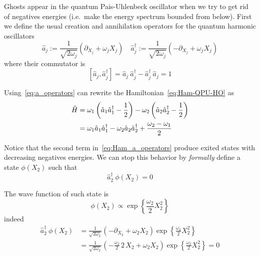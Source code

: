Ghosts appear in the quantum Pais-Uhlenbeck oscillator when we try to get rid
of negatives energies (i.e.\ make the energy spectrum bounded from below).
First we define the usual creation and annihilation operators for the
quantum harmonic oscillators
\begin{equation} \label{eq:a_operators}
  \hat{a}_j := \frac{1}{\sqrt{2\omega_j}}
    \left(\partial_{X_j} + \omega_j X_j\right) \quad
  \hat{a}_j^{\dagger} := \frac{1}{\sqrt{2\omega_j}}
    \left(-\partial_{X_j} + \omega_j X_j\right)
\end{equation}
where their commutator is
\begin{equation} \label{eq:a_commutator}
  \left[ \hat{a}_j, \hat{a}_j^{\dagger} \right] =
  \hat{a}_j \ \hat{a}_j^{\dagger} - \hat{a}_j^{\dagger} \ \hat{a}_j = 1
\end{equation}

Using~\eqref{eq:a_operators} can rewrite the Hamiltonian~\eqref{eq:Ham-QPU-HO} as
\begin{align} \label{eq:Ham_a_operators}
  \hat{H} &=
    \omega_1 \left( \hat{a}_1 \hat{a}_1^{\dagger} - \frac{1}{2} \right) -
    \omega_2 \left( \hat{a}_2 \hat{a}_2^{\dagger} - \frac{1}{2} \right) \notag
    \\    &=
    \omega_1 \hat{a}_1 \hat{a}_1^{\dagger} -
    \omega_2 \hat{a}_2 \hat{a}_2^{\dagger} +
    \frac{\omega_2 - \omega_1}{2}
\end{align}

Notice that the second term in~\eqref{eq:Ham_a_operators} produce exited states
with decreasing negatives energies. We can stop this behavior by \emph{formally}
define a state $\phi(X_2)$ such that
\begin{equation*}
  \hat{a}_2^{\dagger} \ \phi(X_2) = 0
\end{equation*}

The wave function of such state is~\cite{Ilhan13}
\begin{equation*}
  \phi(X_2) \propto \exp \left\{ \frac{\omega_2}{2} X_2^2\right\}
\end{equation*}
indeed
\begin{align*}
  \hat{a}_2^{\dagger} \ \phi(X_2)
  &= \frac{1}{\sqrt{2\omega_2}}
    \left(-\partial_{X_2} + \omega_2 X_2\right)
    \exp \left\{ \frac{\omega_2}{2} X_2^2\right\} \\
  &= \frac{1}{\sqrt{2\omega_2}}
    \left(-\frac{\omega_2}{2} \, 2 \, X_2 + \omega_2 X_2\right)
    \exp \left\{ \frac{\omega_2}{2} X_2^2\right\}
  = 0
\end{align*}

